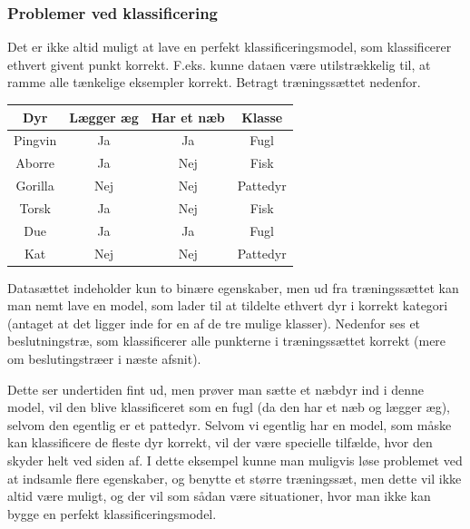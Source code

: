 \documentclass{article}
\begin{document}
\subsubsection{Problemer ved klassificering}
Det er ikke altid muligt at lave en perfekt klassificeringsmodel, som klassificerer ethvert givent punkt korrekt. F.eks. kunne dataen være utilstrækkelig til, at ramme alle tænkelige eksempler korrekt. Betragt træningssættet nedenfor. 

\begin{tabular}{c|c|c|c}
	Dyr & Lægger æg & Har et næb & Klasse\\
	\hline
	Pingvin & Ja & Ja & Fugl\\
	Aborre & Ja & Nej & Fisk\\
	Gorilla & Nej & Nej & Pattedyr\\
	Torsk & Ja & Nej & Fisk\\
	Due & Ja & Ja & Fugl\\
	Kat & Nej & Nej & Pattedyr
\end{tabular}

Datasættet indeholder kun to binære egenskaber, men ud fra træningssættet kan man nemt lave en model, som lader til at tildelte ethvert dyr i korrekt kategori (antaget at det ligger inde for en af de tre mulige klasser). Nedenfor ses et beslutningstræ, som klassificerer alle punkterne i træningssættet korrekt (mere om beslutingstræer i næste afsnit).

\begin{center}
\end{center}
Dette ser undertiden fint ud, men prøver man sætte et næbdyr ind i denne model, vil den blive klassificeret som en fugl (da den har et næb og lægger æg), selvom den egentlig er et pattedyr. Selvom vi egentlig har en model, som måske kan klassificere de fleste dyr korrekt, vil der være specielle tilfælde, hvor den skyder helt ved siden af. I dette eksempel kunne man muligvis løse problemet ved at indsamle flere egenskaber, og benytte et større træningssæt, men dette vil ikke altid være muligt, og der vil som sådan være situationer, hvor man ikke kan bygge en perfekt klassificeringsmodel.
\end{document}
